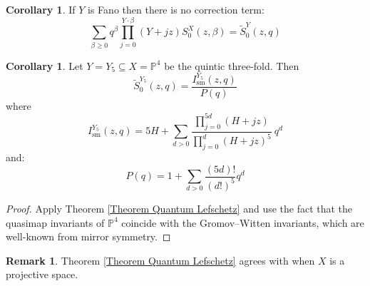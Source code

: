 \documentclass[11pt]{amsart}
\newcommand{\PP}{\mathbb P}
\theoremstyle{definition}
\newtheorem{cor}[thm]{Corollary}
\theoremstyle{definition}
\newtheorem{rmk}[thm]{Remark}
\begin{document}
\begin{cor}
 If $Y$ is Fano then there is no correction term:
\begin{equation*} \sum_{\beta\geq 0} q^\beta\prod_{j=0}^{Y\cdot\beta}(Y+jz)S_0^X(z,\beta) = \tilde{S}_0^Y(z,q) \end{equation*}
\end{cor}

\begin{cor}
Let $Y = Y_5 \subseteq  X = \PP^4$ be the quintic three-fold. Then
\begin{equation*} \tilde{S}_0^{Y_5}(z,q)=\dfrac{I_{\text{sm}}^{Y_5}(z,q)}{P(q)} \end{equation*}
where
\begin{equation*} I_{\text{sm}}^{Y_5}(z,q)=5H+\sum_{d>0}\frac{\prod_{j=0}^{5d}(H+jz)}{\prod_{j=0}^{d}(H+jz)^5} \ q^d \end{equation*}
and:
\begin{equation*} P(q)=1+\sum_{d>0}\frac{(5d)!}{(d!)^5}q^d \end{equation*}
\end{cor}
\begin{proof} Apply Theorem \ref{Theorem Quantum Lefschetz} and use the fact that the quasimap invariants of $\PP^4$ coincide with the Gromov--Witten invariants, which are well-known from mirror symmetry. \end{proof}

\begin{rmk}
Theorem \ref{Theorem Quantum Lefschetz} agrees with \cite[Theorem~1]{CZ-mirror} when $X$ is a projective space.
\end{rmk}


\end{document}
